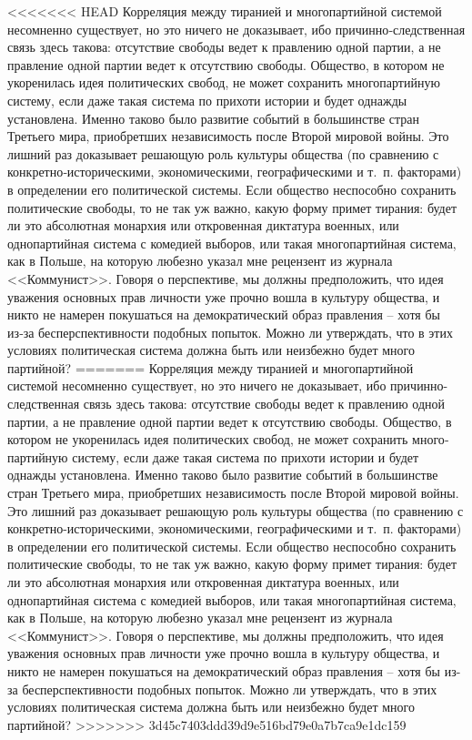 \documentclass{book}
\begin{document}
<<<<<<< HEAD
Корреляция между тиранией и многопартийной системой несомненно существует, но это ничего не доказывает, ибо при­чинно‑следственная связь здесь такова: отсутствие свободы ведет к правлению одной партии, а не правление одной партии ведет к отсутствию свободы. Общество, в котором не укоре­нилась идея политических свобод, не может сохранить много­партийную систему, если даже такая система по прихоти исто­рии и будет однажды установлена. Именно таково было разви­тие событий в большинстве стран Третьего мира, приобретших независимость после Второй мировой войны. Это лишний раз доказывает решающую роль культуры общества (по сравнению с конкретно‑историческими, экономическими, географическими и т.~п. факторами) в определении его политической системы. Если общество неспособно сохранить политические свободы, то не так уж важно, какую форму примет тирания: будет ли это абсолютная монархия или откровенная диктатура военных, или однопартийная система с комедией выборов, или такая многопартийная система, как в Польше, на которую любезно указал мне рецензент из журнала <<Коммунист>>. Говоря о пер­спективе, мы должны предположить, что идея уважения основ­ных прав личности уже прочно вошла в культуру общества, и никто не намерен покушаться на демократический образ прав­ления -- хотя бы из‑за бесперспективности подобных попыток. Можно ли утверждать, что в этих условиях политическая система должна быть или неизбежно будет много партийной?
=======
Корреляция между тиранией и многопартийной системой несомненно существует, но это ничего не доказывает, ибо при­чинно-следственная связь здесь такова: отсутствие свободы ведет к правлению одной партии, а не правление одной партии ведет к отсутствию свободы. Общество, в котором не укоре­нилась идея политических свобод, не может сохранить много­партийную систему, если даже такая система по прихоти исто­рии и будет однажды установлена. Именно таково было разви­тие событий в большинстве стран Третьего мира, приобретших независимость после Второй мировой войны. Это лишний раз доказывает решающую роль культуры общества (по сравнению с конкретно-историческими, экономическими, географическими и т.~п. факторами) в определении его политической системы. Если общество неспособно сохранить политические свободы, то не так уж важно, какую форму примет тирания: будет ли это абсолютная монархия или откровенная диктатура военных, или однопартийная система с комедией выборов, или такая многопартийная система, как в Польше, на 
которую любезно указал мне рецензент из журнала <<Коммунист>>. Говоря о пер­спективе, мы должны предположить, что идея уважения основ­ных прав личности уже прочно вошла в культуру общества, и никто не намерен покушаться на демократический образ прав­ления -- хотя бы из-за бесперспективности подобных попыток. Можно ли утверждать, что в этих условиях политическая система должна быть или неизбежно будет много партийной?
>>>>>>> 3d45c7403ddd39d9e516bd79e0a7b7ca9e1dc159
\end{document}
